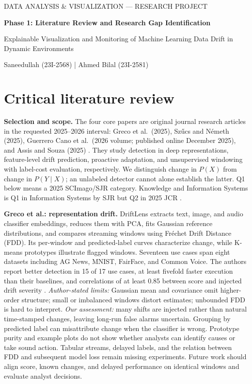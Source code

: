 \documentclass[10pt,a4paper]{article}
\begin{document}
\begin{center}
{\small DATA ANALYSIS \& VISUALIZATION --- RESEARCH PROJECT}\par
{\Large\bfseries Phase 1: Literature Review and Research Gap Identification}\par
Explainable Visualization and Monitoring of Machine Learning Data Drift in Dynamic Environments\par
{\small Saneedullah (23I-2568) \quad | \quad Ahmed Bilal (23I-2581)}
\end{center}
\vspace{-5pt}
\section*{Critical literature review}
\textbf{Selection and scope.} The four core papers are original journal research articles in the requested 2025--2026 interval: Greco et al.\ (2025), Sz\H{u}cs and N\'emeth (2025), Guerrero Cano et al.\ (2026 volume; published online December 2025), and Assis and Souza (2025) \cite{greco,szucs,guerrero,assisu}. They study detection in deep representations, feature-level drift prediction, proactive adaptation, and unsupervised windowing with label-cost evaluation, respectively. We distinguish change in $P(X)$ from change in $P(Y\mid X)$; an unlabeled detector cannot alone establish the latter. Q1 below means a 2025 SCImago/SJR category. Knowledge and Information Systems is Q1 in Information Systems by SJR but Q2 in 2025 JCR \cite{ranking}.

\textbf{Greco et al.: representation drift.} DriftLens extracts text, image, and audio classifier embeddings, reduces them with PCA, fits Gaussian reference distributions, and compares streaming windows using Fr\'echet Drift Distance (FDD). Its per-window and predicted-label curves characterize change, while K-means prototypes illustrate flagged windows. Seventeen use cases span eight datasets including AG News, MNIST, FairFace, and Common Voice. The authors report better detection in 15 of 17 use cases, at least fivefold faster execution than their baselines, and correlations of at least 0.85 between score and injected drift severity \cite{greco}. \emph{Author-stated limits:} Gaussian mean and covariance omit higher-order structure; small or imbalanced windows distort estimates; unbounded FDD is hard to interpret. \emph{Our assessment:} many shifts are injected rather than natural time-stamped changes, leaving long-run false alarms uncertain. Grouping by predicted label can misattribute change when the classifier is wrong. Prototype purity and example plots do not show whether analysts can identify causes or take sound action. Tabular streams, delayed labels, and the relation between FDD and subsequent model loss remain missing experiments. Future work should align score, known changes, and delayed performance on identical windows and evaluate analyst decisions.
\end{document}
